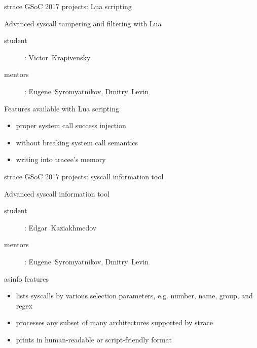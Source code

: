 \documentclass[unicode]{beamer}
\begin{document}
\begin{frame}[fragile]{strace GSoC 2017 projects: Lua scripting}
\begin{block}{\large Advanced syscall tampering and filtering with Lua}
\begin{description}
\item[student]: Victor~Krapivensky
\item[mentors]: Eugene~Syromyatnikov, Dmitry~Levin
\end{description}
\end{block}
\begin{block}{Features available with Lua scripting}
\begin{itemize}
\item proper system call success injection
\item without breaking system call semantics
\item writing into tracee's memory
\end{itemize}
\end{block}
\end{frame}


\begin{frame}{strace GSoC 2017 projects: syscall information tool}
\begin{block}{\large Advanced syscall information tool}
\begin{description}
\item[student]: Edgar~Kaziakhmedov
\item[mentors]: Eugene~Syromyatnikov, Dmitry~Levin
\end{description}
\end{block}
\begin{block}{asinfo features}
\begin{itemize}
\item lists syscalls by various selection parameters,
e.g. number, name, group, and regex
\item processes any subset of many architectures supported by strace
\item prints in human-readable or script-friendly format
\end{itemize}
\end{block}
\end{frame}
\end{document}
